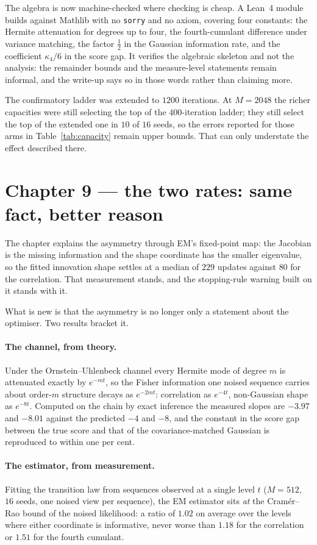 \documentclass[11pt,a4paper]{article}
\begin{document}
The algebra is now machine-checked where checking is cheap. A Lean~4 module builds against Mathlib
with no \texttt{sorry} and no axiom, covering four constants: the Hermite attenuation for degrees
up to four, the fourth-cumulant difference under variance matching, the factor $\tfrac12$ in the
Gaussian information rate, and the coefficient $\kappa_4/6$ in the score gap. It verifies the
algebraic skeleton and not the analysis: the remainder bounds and the measure-level statements
remain informal, and the write-up says so in those words rather than claiming more.

The confirmatory ladder was extended to $1200$ iterations. At $M=2048$ the richer capacities were
still selecting the top of the $400$-iteration ladder; they still select the top of the extended
one in $10$ of $16$ seeds, so the errors reported for those arms in Table~\ref{tab:capacity}
remain upper bounds. That can only understate the effect described there.

\section{Chapter 9 --- the two rates: same fact, better reason}\label{sec:ch9}

The chapter explains the asymmetry through EM's fixed-point map: the Jacobian is the missing
information and the shape coordinate has the smaller eigenvalue, so the fitted innovation shape
settles at a median of $229$ updates against $80$ for the correlation. That measurement stands,
and the stopping-rule warning built on it stands with it.

What is new is that the asymmetry is no longer only a statement about the optimiser. Two results
bracket it.

\paragraph{The channel, from theory.}
Under the Ornstein--Uhlenbeck channel every Hermite mode of degree $m$ is attenuated exactly by
$e^{-mt}$, so the Fisher information one noised sequence carries about order-$m$ structure decays
as $e^{-2mt}$: correlation as $e^{-4t}$, non-Gaussian shape as $e^{-8t}$. Computed on the chain by
exact inference the measured slopes are $-3.97$ and $-8.01$ against the predicted $-4$ and $-8$,
and the constant in the score gap between the true score and that of the covariance-matched
Gaussian is reproduced to within one per cent.

\paragraph{The estimator, from measurement.}
Fitting the transition law from sequences observed at a single level $t$ ($M=512$, $16$ seeds, one
noised view per sequence), the EM estimator sits \emph{at} the Cram\'er--Rao bound of the noised
likelihood: a ratio of $1.02$ on average over the levels where either coordinate is informative,
never worse than $1.18$ for the correlation or $1.51$ for the fourth cumulant.
\end{document}
